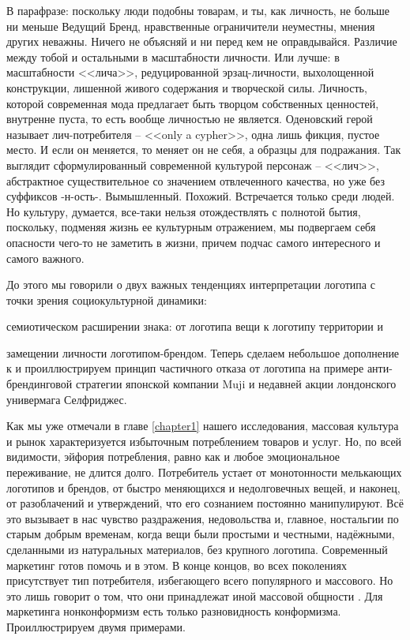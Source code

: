 В парафразе: поскольку люди подобны товарам, и ты, как личность, не больше ни меньше Ведущий Бренд,
нравственные ограничители неуместны, мнения других неважны. Ничего не объясняй и ни перед кем не
оправдывайся. Различие между тобой и остальными в масштабности личности. Или лучше: в масштабности
<<лича>>, редуцированной эрзац-личности, выхолощенной конструкции, лишенной живого содержания и
творческой силы. Личность, которой современная мода предлагает быть творцом собственных ценностей,
внутренне пуста, то есть вообще личностью не является. Оденовский герой называет лич-потребителя --
<<only a cypher>>, одна лишь фикция, пустое место. И если он меняется, то меняет он не себя, а образцы
для подражания. Так выглядит сформулированный современной культурой персонаж -- <<лич>>, абстрактное
существительное со значением отвлеченного качества, но уже без суффиксов -н-ость-. Вымышленный.
Похожий. Встречается только среди людей. Но культуру, думается, все-таки
нельзя отождествлять с полнотой бытия, поскольку, подменяя жизнь ее культурным отражением, мы
подвергаем себя опасности чего-то не заметить в жизни, причем подчас самого интересного и самого
важного.

До этого мы говорили о двух важных тенденциях интерпретации логотипа с точки зрения социокультурной
динамики:
\begin{enumerate*}[label=\arabic*)]
\item семиотическом расширении знака: от логотипа вещи к логотипу территории и
\item замещении личности логотипом-брендом. Теперь сделаем небольшое дополнение к и проиллюстрируем
  принцип частичного отказа от логотипа на примере анти-брендинговой стратегии японской компании
  Muji и недавней акции лондонского универмага Селфриджес.
\end{enumerate*}

Как мы уже отмечали в главе \ref{chapter1} нашего исследования, массовая культура и рынок характеризуется
избыточным потреблением товаров и услуг. Но, по всей видимости, эйфория потребления, равно как и
любое эмоциональное переживание, не длится долго. Потребитель устает от монотонности мелькающих
логотипов и брендов, от быстро меняющихся и недолговечных вещей, и наконец, от разоблачений и
утверждений, что его сознанием постоянно манипулируют. Всё это вызывает в нас чувство раздражения,
недовольства и, главное, ностальгии по старым добрым временам, когда вещи были простыми и честными,
надёжными, сделанными из натуральных материалов, без крупного логотипа. Современный маркетинг готов
помочь и в этом. В конце концов, во всех поколениях присутствует тип потребителя, избегающего всего
популярного и массового. Но это лишь говорит о том, что они принадлежат иной массовой
общности \autocite{lindstrom2011brandwashed}.  Для маркетинга
нонконформизм есть только разновидность конформизма. Проиллюстрируем двумя примерами.

